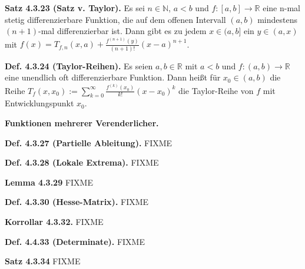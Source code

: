 \textbf{Satz 4.3.23 (Satz v. Taylor).} Es sei $n\in\mathbb{N}$, $a<b$
und $f:[a,b]\rightarrow\mathbb{R}$ eine n-mal stetig differenzierbare
Funktion, die auf dem offenen Intervall $(a,b)$ mindestens $(n+1)$-mal
differenzierbar ist. Dann gibt es zu jedem $x\in(a,b]$ ein $y\in(a,x)$
mit $f(x)=T_{f,n}(x,a)+\frac{f^{(n+1)}(y)}{(n+1)!}(x-a)^{n+1}$.


\textbf{Def. 4.3.24 (Taylor-Reihen).} Es seien $a,b\in\mathbb{R}$
mit $a<b$ und $f:(a,b)\rightarrow\mathbb{R}$ eine unendlich oft
differenzierbare Funktion. Dann heißt für $x_{0}\in(a,b)$ die Reihe
$T_{f}(x,x_{0}):=\sum_{k=0}^{\infty}\frac{f^{(k)}(x_{0})}{k!}(x-x_{0})^{k}$
die Taylor-Reihe von $f$ mit Entwicklungspunkt $x_{0}$.

\textbf{Funktionen mehrerer Verenderlicher.}

\textbf{Def. 4.3.27 (Partielle Ableitung).} FIXME

\textbf{Def. 4.3.28 (Lokale Extrema).} FIXME

\textbf{Lemma 4.3.29} FIXME

\textbf{Def. 4.3.30 (Hesse-Matrix).} FIXME

\textbf{Korrollar 4.3.32.} FIXME

\textbf{Def. 4.4.33 (Determinate).} FIXME

\textbf{Satz 4.3.34} FIXME

